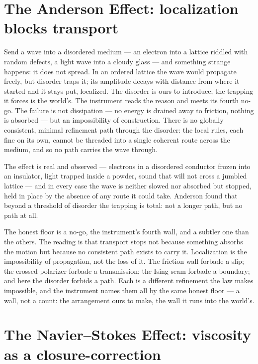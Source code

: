 \section{The Anderson Effect: localization blocks transport}
\label{se:anderson}

Send a wave into a disordered medium --- an electron into a lattice riddled with random defects, a light wave
into a cloudy glass --- and something strange happens: it does not spread. In an ordered lattice the wave
would propagate freely, but disorder traps it; its amplitude decays with distance from where it started and it
stays put, localized. The disorder is ours to introduce; the trapping it forces is the world's. The instrument
reads the reason and meets its fourth no-go. The failure is not
dissipation --- no energy is drained away to friction, nothing is absorbed --- but an impossibility of
construction. There is no globally consistent, minimal refinement path through the disorder: the local rules,
each fine on its own, cannot be threaded into a single coherent route across the medium, and so no path
carries the wave through.

The effect is real and observed --- electrons in a disordered conductor frozen into an insulator, light
trapped inside a powder, sound that will not cross a jumbled lattice --- and in every case the wave is neither
slowed nor absorbed but stopped, held in place by the absence of any route it could take. Anderson found that
beyond a threshold of disorder the trapping is total: not a longer path, but no path at all.

The honest floor is a no-go, the instrument's fourth wall, and a subtler one than the others. The reading is
that transport stops not because something absorbs the motion but because no consistent path exists to carry
it.
Localization is the impossibility of propagation, not the loss of it. The friction wall forbade a slip; the
crossed polarizer forbade a transmission; the Ising seam forbade a boundary; and here the disorder forbids a
path. Each is a different refinement the law makes impossible, and the instrument names them all by the same
honest floor --- a wall, not a count: the arrangement ours to make, the wall it runs into the world's.

\section{The Navier--Stokes Effect: viscosity as a closure-correction}
\label{se:navier-stokes}

